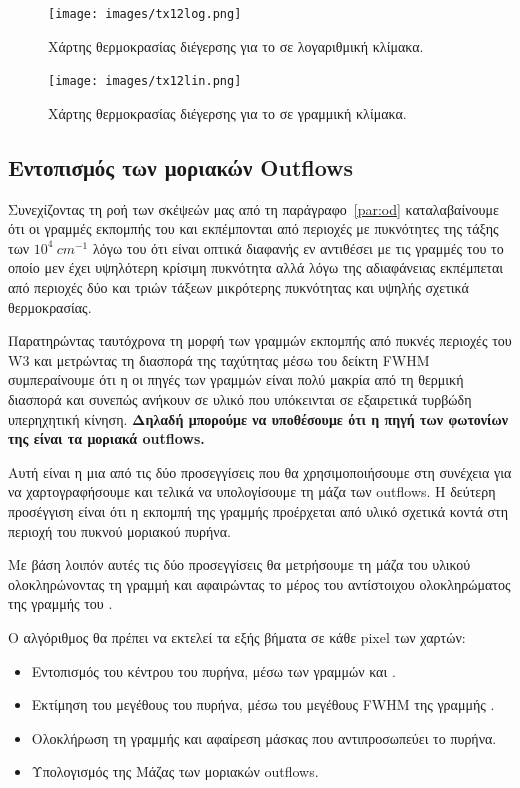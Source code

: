 \documentclass[a4paper,12pt]{memoir}
\begin{document}
\begin{figure}[h!]
	\centering
	\texttt{[image: images/tx12log.png]}
	\caption{Χάρτης θερμοκρασίας διέγερσης για το  σε λογαριθμική κλίμακα.}
	
	
	\centering
	\texttt{[image: images/tx12lin.png]}
	\caption{Χάρτης θερμοκρασίας διέγερσης για το  σε γραμμική κλίμακα.}
\end{figure}



\subsection{Εντοπισμός των μοριακών Outflows}
\label{par:Outflow-Trace}
Συνεχίζοντας τη ροή των σκέψεών μας από τη παράγραφο~\ref{par:od} καταλαβαίνουμε ότι οι γραμμές εκπομπής του  και  εκπέμπονται από περιοχές με πυκνότητες της τάξης των $10^4\ cm^{-1}$ λόγω του ότι είναι οπτικά διαφανής εν αντιθέσει με τις γραμμές του  το οποίο μεν έχει υψηλότερη κρίσιμη πυκνότητα αλλά λόγω της αδιαφάνειας εκπέμπεται από περιοχές δύο και τριών τάξεων μικρότερης πυκνότητας και υψηλής σχετικά θερμοκρασίας.

Παρατηρώντας ταυτόχρονα τη μορφή των γραμμών εκπομπής από πυκνές περιοχές του W3 και μετρώντας τη διασπορά της ταχύτητας μέσω του δείκτη FWHM συμπεραίνουμε ότι η οι πηγές των γραμμών  είναι πολύ μακρία από τη θερμική διασπορά και συνεπώς ανήκουν σε υλικό που υπόκεινται σε εξαιρετικά τυρβώδη υπερηχητική κίνηση. \textbf{Δηλαδή μπορούμε να υποθέσουμε ότι η πηγή των φωτονίων της  είναι τα μοριακά outflows.}
 
Αυτή είναι η μια από τις δύο προσεγγίσεις που θα χρησιμοποιήσουμε στη συνέχεια για να χαρτογραφήσουμε και τελικά να υπολογίσουμε τη μάζα των outflows. Η δεύτερη προσέγγιση είναι ότι η εκπομπή της γραμμής  προέρχεται από υλικό σχετικά κοντά στη περιοχή του πυκνού μοριακού πυρήνα. 

Με βάση λοιπόν αυτές τις δύο προσεγγίσεις θα μετρήσουμε τη μάζα του υλικού  ολοκληρώνοντας τη γραμμή  και αφαιρώντας το μέρος του αντίστοιχου ολοκληρώματος της γραμμής του .

Ο αλγόριθμος θα πρέπει να εκτελεί τα εξής βήματα σε κάθε pixel των χαρτών:
\begin{itemize}
	\item Εντοπισμός του κέντρου του πυρήνα, μέσω των γραμμών  και .
	\item Εκτίμηση του μεγέθους του πυρήνα, μέσω του μεγέθους FWHM της γραμμής .
	\item Ολοκλήρωση τη γραμμής  και αφαίρεση μάσκας που αντιπροσωπεύει το πυρήνα. 
	\item Υπολογισμός της Μάζας των μοριακών outflows. 
\end{itemize}
\end{document}
